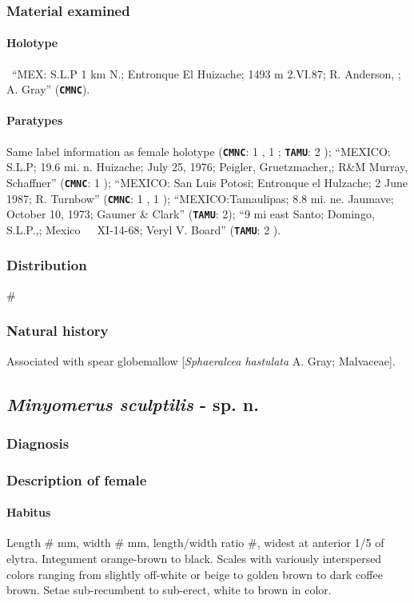 \documentclass[fleqn,10pt,lineno]{wlpeerj} %
\begin{document}
		\subsubsection*{Material examined}
			\paragraph{Holotype}
				\female~``MEX: S.L.P 1 km N.; Entronque El Huizache; 1493 m 2.VI.87; R. Anderson, \underline{}; \underline{} A. Gray'' (\texttt{\textbf{CMNC}}).
			\paragraph{Paratypes}
				Same label information as female holotype (\texttt{\textbf{CMNC}}:  1 \female, 1 \male; \texttt{\textbf{TAMU}}: 2 \male);
				``MEXICO: S.L.P; 19.6 mi. n. Huizache; July 25, 1976; Peigler, Gruetzmacher,; R\&M Murray, Schaffner'' (\texttt{\textbf{CMNC}}: 1 \male);
				``MEXICO: San Luis Potosi; Entronque el Hulzache; 2 June 1987; R. Turnbow'' (\texttt{\textbf{CMNC}}: 1 \female, 1 \male);
				``MEXICO:Tamaulipas; 8.8 mi. ne. Jaumave; October 10, 1973; Gaumer \& Clark'' (\texttt{\textbf{TAMU}}: 2\female);
				``9 mi east Santo; Domingo, S.L.P.,; Mexico~~~XI-14-68; Veryl V. Board'' (\texttt{\textbf{TAMU}}: 2 \male).
		\subsubsection*{Distribution}
			\#
		\subsubsection*{Natural history}
			Associated with spear globemallow [\textit{Sphaeralcea hastulata} A. Gray; Malvaceae].

	\subsection*{\textit{Minyomerus sculptilis} - sp. n.}
		\subsubsection*{Diagnosis}
		\subsubsection*{Description of female}
			\paragraph{Habitus}
				Length \# mm, width \# mm, length/width ratio \#, widest at anterior 1/5 of elytra.
				Integument orange-brown to black.
				Scales with variously interspersed colors ranging from slightly off-white or beige to golden brown to dark coffee brown.
				Setae sub-recumbent to sub-erect, white to brown in color.
\end{document}
